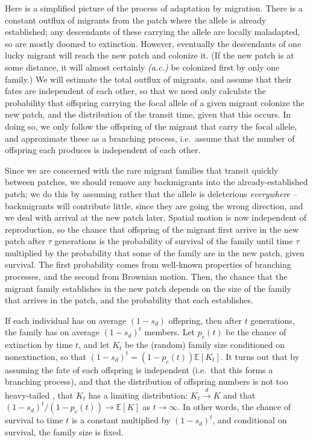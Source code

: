 \documentclass{article}
\newcommand{\E}{\mathbb{E}}
\newcommand{\dconv}{\xrightarrow{d}}
\newcommand{\plr}[1]{{\it\color{blue}(#1)}}
\begin{document}
Here is a simplified picture of the process of adaptation by migration.
There is a constant outflux of migrants from the patch where the allele is already established; 
any descendants of these carrying the allele are locally maladapted, so are mostly doomed to extinction.
However, eventually the descendants of one lucky migrant will reach the new patch and colonize it.
(If the new patch is at some distance, it will almost certainly \plr{a.c.} be colonized first by only one family.)
We will estimate the total outflux of migrants, and assume that their fates are independent of each other,
so that we need only calculate the probability that offspring carrying the focal allele of a given migrant colonize the new patch,
and the distribution of the transit time, given that this occurs.
In doing so, we only follow the offspring of the migrant that carry the focal allele,
and approximate these as a branching process, 
i.e.\ assume that the number of offspring each produces is independent of each other.

Since we are concerned with the rare migrant families that transit quickly between patches, 
we should remove any backmigrants into the already-established patch;
we do this by assuming rather that the allele is deleterious \emph{everywhere} --
backmigrants will contribute little, since they are going the wrong direction,
and we deal with arrival at the new patch later.
Spatial motion is now independent of reproduction,
so the chance that offspring of the migrant first arrive in the new patch after $\tau$ generations 
is the probability of survival of the family until time $\tau$
multiplied by the probability that some of the family are in the new patch, given survival.
The first probability comes from well-known properties of branching processes,
and the second from Brownian motion.
Then, the chance that the migrant family establishes in the new patch 
depends on the size of the family that arrives in the patch,
and the probability that each establishes.

If each individual has on average $(1-s_d)$ offspring, then after $t$ generations,
the family has on average $(1-s_d)^t$ members.
Let $p_e(t)$ be the chance of extinction by time $t$, and let $K_t$ be the (random) family size conditioned on nonextinction,
so that $(1-s_d)^t = (1-p_e(t))\E[K_t]$.
It turns out that by assuming the fate of each offspring is independent (i.e.\ that this forms a branching process),
and that the distribution of offspring numbers is not too heavy-tailed \citep[see][for details]{jaegers1976branching},
that $K_t$ has a limiting distribution: $K_t \dconv K$ 
and that $(1-s_d)^{t}/(1-p_e(t)) \to \E[K]$ as $t \to \infty$.
In other words, the chance of survival to time $t$ is a constant multiplied by $(1-s_d)^t$,
and conditional on survival, the family size is fixed.
\end{document}
